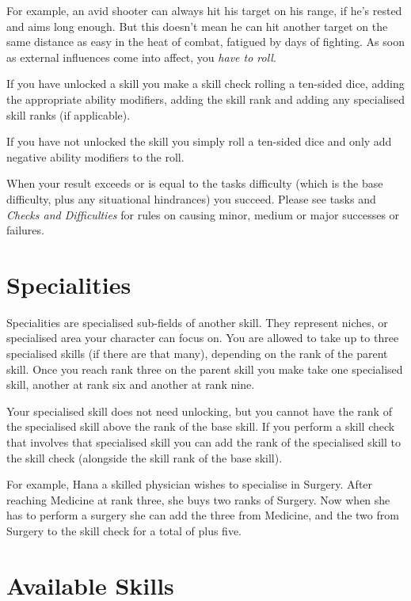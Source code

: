 For example, an avid shooter can always hit his target on his range, if he's
rested and aims long enough. But this doesn't mean he can hit another target
on the same distance as easy in the heat of combat, fatigued by days of
fighting. As soon as external influences come into affect, you \emph{have to
  roll}.

If you have unlocked a skill you make a skill check rolling a ten-sided dice,
adding the appropriate ability modifiers, adding the skill rank and adding any
specialised skill ranks (if applicable).

If you have not unlocked the skill you simply roll a ten-sided dice and only
add negative ability modifiers to the roll.

When your result exceeds or is equal to the tasks difficulty (which is the base
difficulty, plus any situational hindrances) you succeed. Please see tasks and
\emph{Checks and Difficulties} for rules on causing minor, medium or major
successes or failures.

\section{Specialities}
\label{sec:4-Specialities}

Specialities are specialised sub-fields of another skill. They represent
niches, or specialised area your character can focus on. You are allowed to
take up to three specialised skills (if there are that many), depending on
the rank of the parent skill. Once you reach rank three on the parent skill
you make take one specialised skill, another at rank six and another at rank
nine.

Your specialised skill does not need unlocking, but you cannot have the rank
of the specialised skill above the rank of the base skill. If you perform a
skill check that involves that specialised skill you can add the rank of the
specialised skill to the skill check (alongside the skill rank of the base
skill).

For example, Hana a skilled physician wishes to specialise in Surgery. After
reaching Medicine at rank three, she buys two ranks of Surgery. Now when she
has to perform a surgery she can add the three from Medicine, and the two from
Surgery to the skill check for a total of plus five.

\section{Available Skills}
\label{sec:4-Available Skills}

